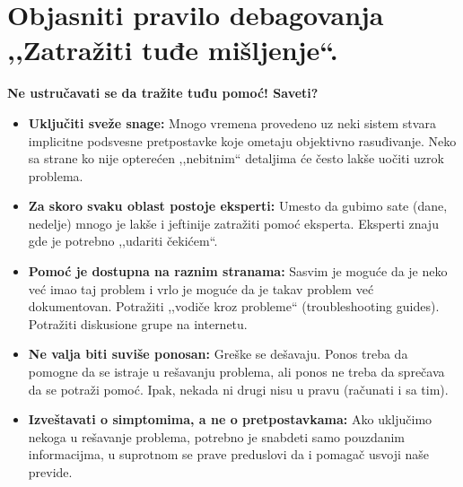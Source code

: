 \documentclass[a4paper]{article}
\begin{document}
\section{Objasniti pravilo debagovanja ,,Zatražiti tuđe mišljenje``.}
  \noindent \textbf{Ne ustručavati se da tražite tuđu pomoć! Saveti?}
  \begin{itemize}
    \item \textbf{Uključiti sveže snage:} Mnogo vremena provedeno uz neki sistem stvara implicitne
          podsvesne pretpostavke koje ometaju objektivno rasuđivanje. Neko sa strane ko nije 
          opterećen ,,nebitnim`` detaljima će često lakše uočiti uzrok problema. 
    \item \textbf{Za skoro svaku oblast postoje eksperti:} Umesto da gubimo sate (dane, nedelje)
          mnogo je lakše i jeftinije zatražiti pomoć eksperta. Eksperti znaju gde je potrebno
          ,,udariti čekićem``.
    \item \textbf{Pomoć je dostupna na raznim stranama:} Sasvim je moguće da je neko već imao taj
          problem i vrlo je moguće da je takav problem već dokumentovan. Potražiti 
          ,,vodiče kroz probleme`` (troubleshooting guides). Potražiti diskusione grupe na internetu.
    \item \textbf{Ne valja biti suviše ponosan:} Greške se dešavaju. Ponos treba da pomogne da 
          se istraje u rešavanju problema, ali ponos ne treba da sprečava da se potraži pomoć.
          Ipak, nekada ni drugi nisu u pravu (računati i sa tim).
    \item \textbf{Izveštavati o simptomima, a ne o pretpostavkama:} Ako uključimo nekoga u rešavanje
          problema, potrebno je snabdeti samo pouzdanim informacijma, u suprotnom se prave 
          preduslovi da i pomagač usvoji naše previde. 
  \end{itemize}
\end{document}
